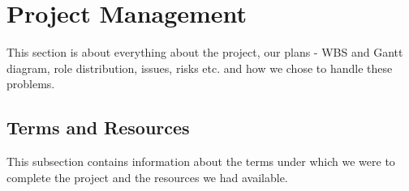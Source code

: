 \section{Project Management}
This section is about everything about the project, our plans - WBS and Gantt diagram, role distribution, issues, risks etc. and how we chose to handle these problems.%

\subsection{Terms and Resources}
This subsection contains information about the terms under which we were to complete the project and the resources we had available.